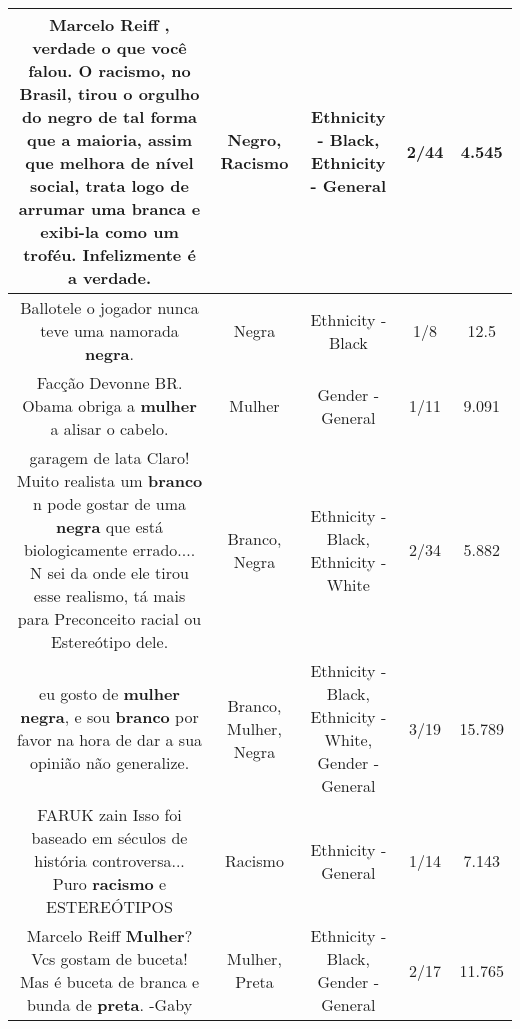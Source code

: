 \documentclass[11pt]{article}
\newlength\mylength
\begin{document}
\begin{center}
\begin{longtable}{|C{.65\mylength}|C{.30\mylength}|C{.12\mylength}|C{.12\mylength}|C{.12\mylength}|}
  \small Marcelo Reiff , verdade o que você falou. O \textbf{racismo}, no Brasil, tirou o orgulho do \textbf{negro} de tal forma que a maioria, assim que melhora de nível social, trata logo de arrumar uma branca e exibi-la como um troféu. Infelizmente é a verdade.\normalsize   & Negro, Racismo & Ethnicity - Black, Ethnicity - General & 2/44 & 4.545 \\  \hline
  \small Ballotele o jogador nunca teve uma namorada \textbf{negra}.\normalsize   & Negra & Ethnicity - Black & 1/8 & 12.5 \\  \hline
  \small Facção Devonne BR. Obama obriga a \textbf{mulher} a alisar o cabelo.\normalsize   & Mulher & Gender - General & 1/11 & 9.091 \\  \hline
  \small garagem de lata Claro! Muito realista um \textbf{branco} n pode gostar de uma \textbf{negra} que está biologicamente errado.... N sei da onde ele tirou esse realismo, tá mais para Preconceito racial ou Estereótipo dele.\normalsize   & Branco, Negra & Ethnicity - Black, Ethnicity - White & 2/34 & 5.882 \\  \hline
  \small eu gosto de \textbf{mulher} \textbf{negra}, e sou \textbf{branco} por favor na hora de dar a sua opinião não generalize.\normalsize   & Branco, Mulher, Negra & Ethnicity - Black, Ethnicity - White, Gender - General & 3/19 & 15.789 \\  \hline
  \small FARUK zain Isso foi baseado em séculos de história controversa...  Puro \textbf{racismo} e ESTEREÓTIPOS\normalsize   & Racismo & Ethnicity - General & 1/14 & 7.143 \\  \hline
  \small Marcelo Reiff \textbf{Mulher}? Vcs gostam de buceta! Mas é buceta de branca e bunda de \textbf{preta}. -Gaby\normalsize   & Mulher, Preta & Ethnicity - Black, Gender - General & 2/17 & 11.765 \\  \hline

\end{longtable}
\end{center}
\end{document}
